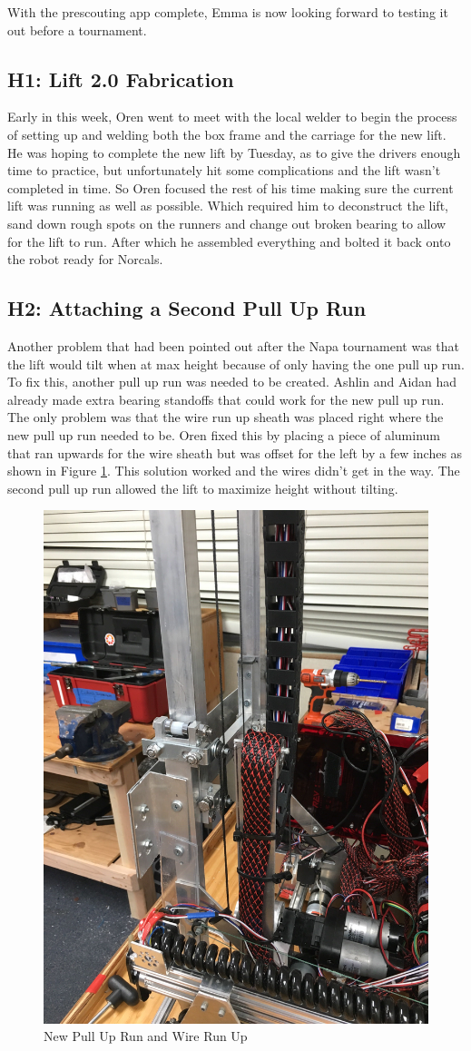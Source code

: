 \documentclass{article}
\begin{document}
With the prescouting app complete, Emma is now looking forward to testing it out before a tournament. 
\subsection{H1: Lift 2.0 Fabrication}

Early in this week, Oren went to meet with the local welder to begin the process of setting up and welding both the box frame and the carriage for the new lift. He was hoping to complete the new lift by Tuesday, as to give the drivers enough time to practice, but unfortunately hit some complications and the lift wasn't completed in time. So Oren focused the rest of his time making sure the current lift was running as well as possible. Which required him to deconstruct the lift, sand down rough spots on the runners and change out broken bearing to allow for the lift to run. After which he assembled everything and bolted it back onto the robot ready for Norcals. 

\subsection{H2: Attaching a Second Pull Up Run}

Another problem that had been pointed out after the Napa tournament was that the lift would tilt when at max height because of only having the one pull up run. To fix this, another pull up run was needed to be created. Ashlin and Aidan had already made extra bearing standoffs that could work for the new pull up run. The only problem was that the wire run up sheath was placed right where the new pull up run needed to be. Oren fixed this by placing a piece of aluminum that ran upwards for the wire sheath but was offset for the left by a few inches as shown in Figure \ref{fig:PullUp}. This solution worked and the wires didn't get in the way. The second pull up run allowed the lift to maximize height without tilting.

\begin{figure}
    \centering
    \includegraphics[width= 0.5 \textwidth]{26_02-25/images/PullUpRun2.jpg}
    \caption{New Pull Up Run and Wire Run Up}
    \label{fig:PullUp}
\end{figure}
\end{document}
